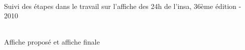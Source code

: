 \begin{center}
                \\
                Suivi des étapes dans le travail sur l'affiche des 24h de l'insa, 36ème édition - 2010
            \end{center}
            
            \begin{center}
                \\
                Affiche proposé et affiche finale  
            \end{center}
            
